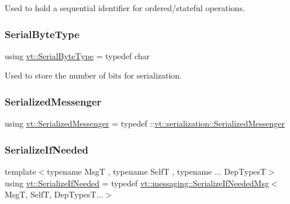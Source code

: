 Used to hold a sequential identifier for ordered/stateful operations. 

\mbox{\label{namespacevt_ad48e08beb69a7f184fb1fdb4b7044174}} 
\subsubsection{\texorpdfstring{Serial\+Byte\+Type}{SerialByteType}}
{\footnotesize\ttfamily using \hyperlink{namespacevt_ad48e08beb69a7f184fb1fdb4b7044174}{vt\+::\+Serial\+Byte\+Type} = typedef char}



Used to store the number of bits for serialization. 

\mbox{\label{namespacevt_a490b7af99bdeb06e988d94a7ab389b43}} 
\subsubsection{\texorpdfstring{Serialized\+Messenger}{SerializedMessenger}}
{\footnotesize\ttfamily using \hyperlink{namespacevt_a490b7af99bdeb06e988d94a7ab389b43}{vt\+::\+Serialized\+Messenger} = typedef \+::\hyperlink{structvt_1_1serialization_1_1_serialized_messenger}{vt\+::serialization\+::\+Serialized\+Messenger}}

\mbox{\label{namespacevt_a0a4ad8c256fcffa564e9fa7800e4b495}} 
\subsubsection{\texorpdfstring{Serialize\+If\+Needed}{SerializeIfNeeded}}
{\footnotesize\ttfamily template$<$typename MsgT , typename SelfT , typename ... Dep\+TypesT$>$ \\
using \hyperlink{namespacevt_a0a4ad8c256fcffa564e9fa7800e4b495}{vt\+::\+Serialize\+If\+Needed} = typedef \hyperlink{structvt_1_1messaging_1_1_serialize_if_needed_msg}{vt\+::messaging\+::\+Serialize\+If\+Needed\+Msg}$<$MsgT, SelfT, Dep\+Types\+T...$>$}

\mbox{\label{namespacevt_a9e60e2e8929828639383ac1d6643384d}} 
